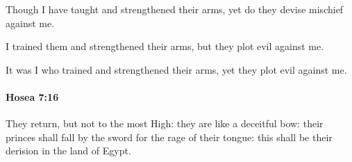 			\begin{versebox}
					\item[BHS] 
					\item[LXX] 
					\item[ASV] Though I have taught and strengthened their arms, yet do they devise mischief against me.
					\item[NIV] I trained them and strengthened their arms, but they plot evil against me.
					\item[NRSV] It was I who trained and strengthened their arms, yet they plot evil against me.
			\end{versebox}

		\paragraph{Hosea 7:16} %
			\label{HOSEA-7-16}

			They return, but not to the most High: they are like a deceitful bow: their princes shall fall by the sword for the rage of their tongue: this shall be their derision in the land of Egypt.

